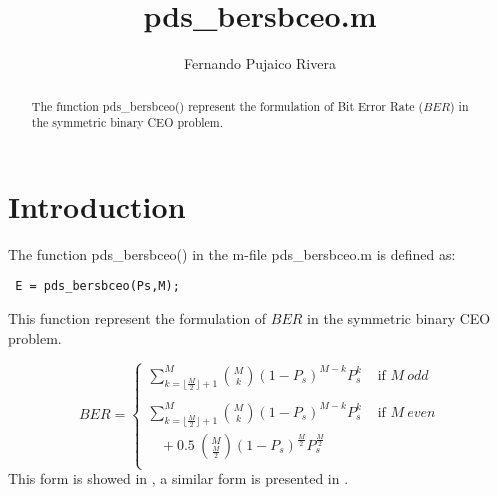 \documentclass[a4paper,10pt]{article}
\title{pds\_bersbceo.m}
\author{Fernando Pujaico Rivera}
\begin{document}
\maketitle
\begin{abstract}
The function pds\_bersbceo() represent the formulation of Bit Error Rate ($BER$) 
in the symmetric binary CEO problem.
\end{abstract}

\section{Introduction}
The function pds\_bersbceo() in the m-file pds\_bersbceo.m is defined as:
\lstset{language=octave}%
\begin{lstlisting}
 E = pds_bersbceo(Ps,M);
\end{lstlisting}
This function represent the formulation of $BER$ in the symmetric binary CEO problem.

\begin{equation}\label{eq:bersbceo}
BER= 
\begin{cases}
\sum \limits_{k=\lfloor \frac{M}{2} \rfloor +1}^{M} \binom{M}{k}  (1-P_s)^{M-k} P_s^k & \text{ if } M~odd \\ 
~ & ~ \\
\sum \limits_{k=\lfloor \frac{M}{2} \rfloor +1}^{M} \binom{M}{k}  (1-P_s)^{M-k} P_s^k & \text{ if } M~even \\
~~~~+0.5~\binom{M}{\frac{M}{2}}  (1-P_s)^{\frac{M}{2}} P_s^{\frac{M}{2}} & ~ \\
\end{cases}
\end{equation}
This form is showed in \cite{berbinaryceo}, a similar form is presented in \cite{Abrardo2009,Ferrari2012}.
\end{document}
